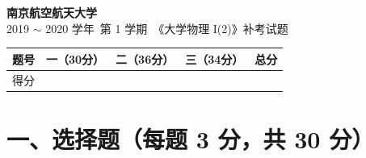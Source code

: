 \documentclass[zihao=5,a4paper,UTF8]{ctexart}
\begin{document}
\begin{center}
    {\Large\bfseries 南京航空航天大学}\\[4pt]
    {\large 2019 $\sim$ 2020 学年\ 第 1 学期\ 《大学物理 I(2)》补考试题}
\end{center}

\begin{center}
\begin{tabular}{|c|c|c|c|c|}
\hline
题号 & 一（30分） & 二（36分） & 三（34分） & 总分 \\
\hline
得分 & \hspace{2.2cm} & \hspace{2.2cm} & \hspace{2.2cm} & \hspace{2.2cm} \\
\hline
\end{tabular}
\end{center}

\section*{一、选择题（每题 3 分，共 30 分）}
\end{document}
